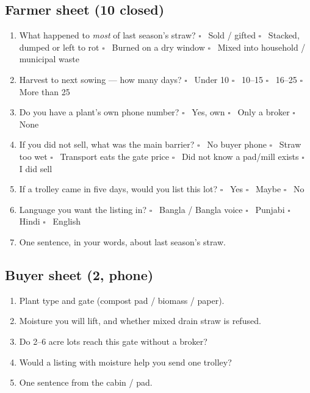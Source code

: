 \documentclass[12pt,a4paper]{article}
\newcommand{\tick}{$\square$\ }
\begin{document}
\subsection{Farmer sheet (10 closed)}
\begin{enumerate}[leftmargin=1.5em]
  \item What happened to \emph{most} of last season's straw? \tick{} Sold / gifted \quad \tick{} Stacked, dumped or left to rot \quad \tick{} Burned on a dry window \quad \tick{} Mixed into household / municipal waste
  \item Harvest to next sowing --- how many days? \tick{} Under 10 \quad \tick{} 10--15 \quad \tick{} 16--25 \quad \tick{} More than 25
  \item Do you have a plant's own phone number? \tick{} Yes, own \quad \tick{} Only a broker \quad \tick{} None
  \item If you did not sell, what was the main barrier? \tick{} No buyer phone \quad \tick{} Straw too wet \quad \tick{} Transport eats the gate price \quad \tick{} Did not know a pad/mill exists \quad \tick{} I did sell
  \item If a trolley came in five days, would you list this lot? \tick{} Yes \quad \tick{} Maybe \quad \tick{} No
  \item Language you want the listing in? \tick{} Bangla / Bangla voice \quad \tick{} Punjabi \quad \tick{} Hindi \quad \tick{} English
  \item One sentence, in your words, about last season's straw.
\end{enumerate}

\subsection{Buyer sheet (2, phone)}
\begin{enumerate}[leftmargin=1.5em]
  \item Plant type and gate (compost pad / biomass / paper).
  \item Moisture you will lift, and whether mixed drain straw is refused.
  \item Do 2--6 acre lots reach this gate without a broker?
  \item Would a listing with moisture help you send one trolley?
  \item One sentence from the cabin / pad.
\end{enumerate}
\end{document}
